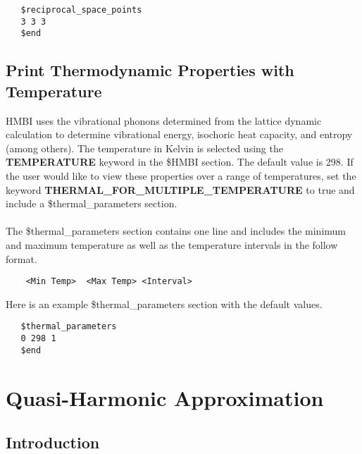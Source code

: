 \documentclass[11pt,letterpaper]{article}
\begin{document}
\begin{spacing}{1.0}
\begin{verbatim}
   $reciprocal_space_points
   3 3 3               
   $end
\end{verbatim}

\subsection{Print Thermodynamic Properties with Temperature}

HMBI uses the vibrational phonons determined from the lattice dynamic 
calculation to determine vibrational energy, isochoric
heat capacity, and entropy (among others). The temperature in Kelvin is selected
using the {\bf TEMPERATURE} keyword in the \$HMBI section. The default 
value is 298. If the user would like to view these properties over a range of
temperatures, set the keyword {\bf THERMAL\_FOR\_MULTIPLE\_TEMPERATURE} to true 
and include a \$thermal\_parameters section. 
\\
\\
\noindent
The \$thermal\_parameters section contains one line and includes the minimum 
and maximum temperature as well as the temperature intervals in the follow format.

\begin{verbatim}
    <Min Temp>  <Max Temp> <Interval>
\end{verbatim}
Here is an example \$thermal\_parameters section with the default values.
\begin{verbatim}
   $thermal_parameters
   0 298 1
   $end 
\end{verbatim}

\section{Quasi-Harmonic Approximation}

\subsection{Introduction}


\end{spacing}
\end{document}
